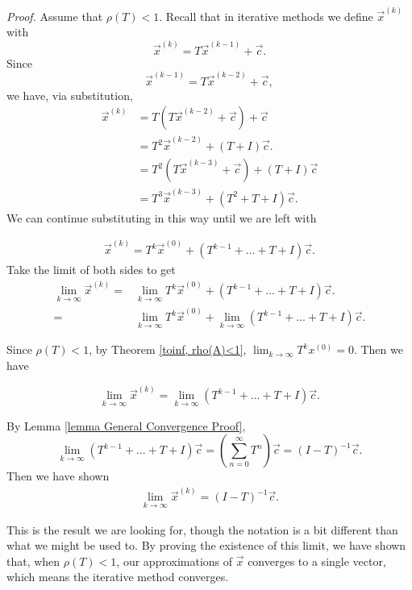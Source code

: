 \documentclass[12pt,letterpaper]{article}
\theoremstyle{definition}
\begin{document}
\noindent \textit{Proof.} 
Assume that $\rho(T) < 1$. Recall that in iterative methods we define $\vec{x}^{(k)}$ with 
$$\vec{x}^{(k)} = T\vec{x}^{(k-1)} + \vec{c}.$$ Since 
$$\vec{x}^{(k-1)} = T\vec{x}^{(k-2)} + \vec{c},$$ we have, via substitution, 
\begin{align*}\vec{x}^{(k)} &= T\left(T\vec{x}^{(k-2)} + \vec{c}\right) + \vec{c}
\\&= T^{2}\vec{x}^{(k-2)} + (T + I)\vec{c}.
\\&= T^{2}\left(T\vec{x}^{(k-3)} + \vec{c}\right) + (T + I)\vec{c} 
\\&= T^{3}\vec{x}^{(k-3)} + (T^2 + T + I)\vec{c}.\end{align*} 
We can continue substituting in this way until we are left with 

\begin{align*}\vec{x}^{(k)} = T^{k}\vec{x}^{(0)} + \left(T^{k-1} + ... + T + I\right)\vec{c}.\end{align*} Take the limit of both sides to get 
\begin{align*}\lim_{k\to\infty}\vec{x}^{(k)} =& \lim_{k\to\infty}T^{k}\vec{x}^{(0)} + \left(T^{k-1} + ... + T + I\right)\vec{c}. 
\\ =& \lim_{k\to\infty}T^{k}\vec{x}^{(0)} + \lim_{k\to\infty}\left(T^{k-1} + ... + T + I\right)\vec{c}.\end{align*} 

\noindent Since $\rho(T) < 1$, by Theorem \ref{toinf, rho(A)<1},  $\lim_{k\to\infty}T^{k}x^{(0)} = 0$. Then we have 

$$\lim_{k\to\infty}\vec{x}^{(k)} = \lim_{k\to\infty}\left(T^{k-1} + ... + T + I\right)\vec{c}.$$ 

\noindent By Lemma \ref{lemma General Convergence Proof}, %
$$\lim_{k\to\infty}\left(T^{k-1} + ... + T + I\right)\vec{c} = \left(\sum_{n=0}^{\infty} T^{n}\right)\vec{c}= (I - T)^{-1}\vec{c}.$$
Then we have shown \begin{align*}\lim_{k\to\infty}\vec{x}^{(k)} = (I - T)^{-1}\vec{c}.\end{align*} 

This is the result we are looking for, though the notation is a bit different than what we might be used to. By proving the existence of this limit, we have shown that, when $\rho(T) < 1$, our approximations of $\vec{x}$ converges to a single vector, which means the iterative method converges.
\end{document}
